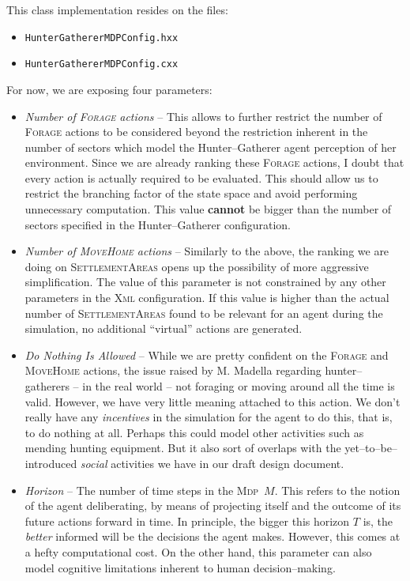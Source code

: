 \documentclass[a4paper,10pt]{article}
\newcommand{\mdp}{\textsc{Mdp}}
\begin{document}
This class implementation resides on the files:
\begin{itemize}
\item \texttt{HunterGathererMDPConfig.hxx}
\item \texttt{HunterGathererMDPConfig.cxx}
\end{itemize}

For now, we are exposing four parameters:

\begin{itemize}
 \item \emph{Number of \textsc{Forage} actions} -- This allows to further restrict the number of \textsc{Forage} actions
to be considered beyond the restriction inherent in the number of sectors which model the Hunter--Gatherer agent perception
of her environment. Since we are already ranking these \textsc{Forage} actions, I doubt that every action is actually required
to be evaluated. This should allow us to restrict the branching factor of the state space and avoid performing unnecessary
computation. This value \textbf{cannot} be bigger than the number of sectors specified in the Hunter--Gatherer configuration.
\item \emph{Number of \textsc{MoveHome} actions} -- Similarly to the above, the ranking we are doing on 
\textsc{SettlementAreas} opens up the possibility of more aggressive simplification. The value of this parameter is not
constrained by any other parameters in the \textsc{Xml} configuration. If this value is higher than the actual number of
\textsc{SettlementAreas} found to be relevant for an agent during the simulation, no additional ``virtual'' actions are
generated.
\item \emph{Do Nothing Is Allowed} -- While we are pretty confident on the \textsc{Forage} and \textsc{MoveHome} actions,
the issue raised by M. Madella regarding hunter--gatherers -- in the real world -- not foraging or moving around all the
time is valid. However, we have very little meaning attached to this action. We don't really have any \emph{incentives}
in the simulation for the agent to do this, that is, to do nothing at all. Perhaps this could model other activities
such as mending hunting equipment. But it also sort of overlaps with the yet--to--be--introduced \emph{social} activities
we have in our draft design document.
\item \emph{Horizon} -- The number of time steps in the \mdp~$M$. This refers to the notion of the agent deliberating,
by means of projecting itself and the outcome of its future actions forward in time. In principle, the bigger this
horizon $T$ is, the \emph{better} informed will be the decisions the agent makes. However, this comes at a hefty
computational cost. On the other hand, this parameter can also model cognitive limitations inherent to human decision--making.
\end{itemize}
\end{document}
